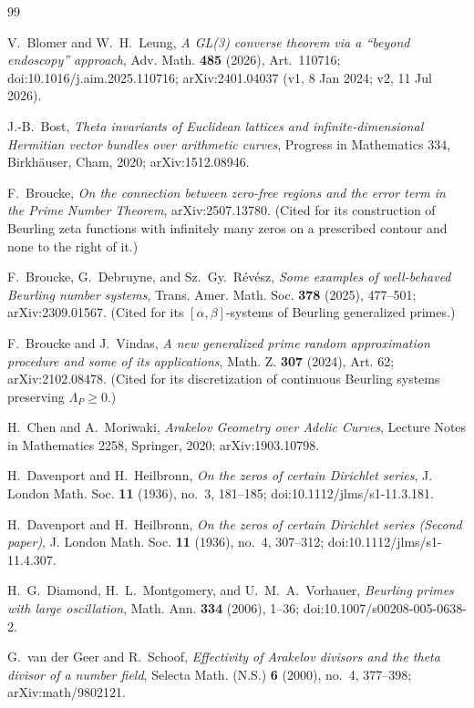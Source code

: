 \documentclass[11pt]{article}
\theoremstyle{plain}
\theoremstyle{definition}
\theoremstyle{remark}
\begin{document}
\begin{thebibliography}{99}

V.~Blomer and W.~H.~Leung,
\emph{A GL(3) converse theorem via a ``beyond endoscopy'' approach},
Adv. Math. \textbf{485} (2026), Art.\ 110716;
doi:10.1016/j.aim.2025.110716;
arXiv:2401.04037 (v1, 8 Jan 2024; v2, 11 Jul 2026).

J.-B.~Bost,
\emph{Theta invariants of Euclidean lattices and infinite-dimensional
Hermitian vector bundles over arithmetic curves},
Progress in Mathematics 334, Birkh\"auser, Cham, 2020;
arXiv:1512.08946.

F.~Broucke,
\emph{On the connection between zero-free regions and the error term in the
Prime Number Theorem},
arXiv:2507.13780.
(Cited for its construction of Beurling zeta functions with infinitely many
zeros on a prescribed contour and none to the right of it.)

F.~Broucke, G.~Debruyne, and Sz.~Gy.~R\'ev\'esz,
\emph{Some examples of well-behaved Beurling number systems},
Trans. Amer. Math. Soc. \textbf{378} (2025), 477--501;
arXiv:2309.01567.
(Cited for its $[\alpha, \beta]$-systems of Beurling generalized primes.)

F.~Broucke and J.~Vindas,
\emph{A new generalized prime random approximation procedure and some of its
applications},
Math. Z. \textbf{307} (2024), Art. 62;
arXiv:2102.08478.
(Cited for its discretization of continuous Beurling systems preserving
$\Lambda_P \ge 0$.)

H.~Chen and A.~Moriwaki,
\emph{Arakelov Geometry over Adelic Curves},
Lecture Notes in Mathematics 2258, Springer, 2020;
arXiv:1903.10798.

H.~Davenport and H.~Heilbronn,
\emph{On the zeros of certain Dirichlet series},
J. London Math. Soc. \textbf{11} (1936), no.~3, 181--185;
doi:10.1112/jlms/s1-11.3.181.

H.~Davenport and H.~Heilbronn,
\emph{On the zeros of certain Dirichlet series (Second paper)},
J. London Math. Soc. \textbf{11} (1936), no.~4, 307--312;
doi:10.1112/jlms/s1-11.4.307.

H.~G.~Diamond, H.~L.~Montgomery, and U.~M.~A.~Vorhauer,
\emph{Beurling primes with large oscillation},
Math. Ann. \textbf{334} (2006), 1--36;
doi:10.1007/s00208-005-0638-2.

G.~van der Geer and R.~Schoof,
\emph{Effectivity of Arakelov divisors and the theta divisor of a number
field},
Selecta Math. (N.S.) \textbf{6} (2000), no.~4, 377--398;
arXiv:math/9802121.


\end{thebibliography}
\end{document}
